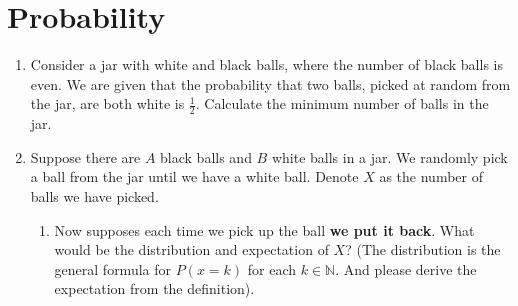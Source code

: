 \documentclass{article}
\begin{document}
\section{Probability}
\begin{enumerate}
    \item Consider a jar with white and black balls, where the  number of black balls is even. We are given that the probability that two balls, picked at random from the jar, are both white is $\frac{1}{2}$. Calculate the minimum number of balls in the jar.
    \newpage
    \item Suppose there are $A$ black balls and $B$ white balls in a jar. We randomly pick a ball from the jar until we have a white ball. Denote $X$ as the number of balls we have picked.
    \begin{enumerate}
        \item Now supposes each time we pick up the ball \textbf{ we put it back}. What would be the distribution and expectation of $X$? (The distribution is the general formula for $P(x=k)$ for each $k \in \mathbb{N}$. And please derive the expectation from the definition).
        \newpage
        \
        \newpage
    \end{enumerate}
\end{enumerate}
\end{document}
